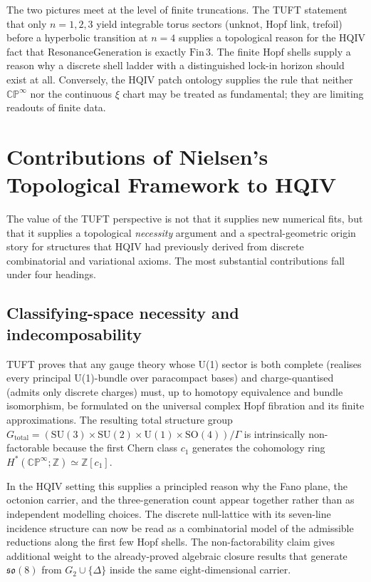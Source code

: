 \documentclass[11pt]{article}
\begin{document}
The two pictures meet at the level of finite truncations. The TUFT
statement that only $n=1,2,3$ yield integrable torus sectors (unknot,
Hopf link, trefoil) before a hyperbolic transition at $n=4$ supplies a
topological reason for the HQIV fact that $\mathrm{ResonanceGeneration}$
is exactly $\mathrm{Fin}\,3$. The finite Hopf shells supply a reason why
a discrete shell ladder with a distinguished lock-in horizon should
exist at all. Conversely, the HQIV patch ontology supplies the rule that
neither $\mathbb{CP}^\infty$ nor the continuous $\xi$ chart may be
treated as fundamental; they are limiting readouts of finite data.

\section{Contributions of Nielsen's Topological Framework to HQIV}

The value of the TUFT perspective is not that it supplies new numerical
fits, but that it supplies a topological \emph{necessity} argument and a
spectral-geometric origin story for structures that HQIV had previously
derived from discrete combinatorial and variational axioms. The most
substantial contributions fall under four headings.

\subsection{Classifying-space necessity and indecomposability}

TUFT proves that any gauge theory whose U(1) sector is both complete
(realises every principal U(1)-bundle over paracompact bases) and
charge-quantised (admits only discrete charges) must, up to homotopy
equivalence and bundle isomorphism, be formulated on the universal
complex Hopf fibration and its finite approximations. The resulting
total structure group $G_{\mathrm{total}} = (\mathrm{SU}(3)\times
\mathrm{SU}(2)\times\mathrm{U}(1)\times\mathrm{SO}(4))/\Gamma$ is
intrinsically non-factorable because the first Chern class $c_1$
generates the cohomology ring $H^*(\mathbb{CP}^\infty;\mathbb{Z})\simeq
\mathbb{Z}[c_1]$.

In the HQIV setting this supplies a principled reason why the Fano
plane, the octonion carrier, and the three-generation count appear
together rather than as independent modelling choices. The discrete
null-lattice with its seven-line incidence structure can now be read as
a combinatorial model of the admissible reductions along the first few
Hopf shells. The non-factorability claim gives additional weight to the
already-proved algebraic closure results that generate $\mathfrak{so}(8)$
from $G_2\cup\{\Delta\}$ inside the same eight-dimensional carrier.
\end{document}
